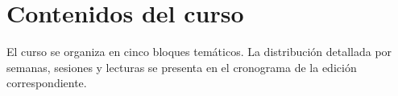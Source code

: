 
%

\section{Contenidos del curso}

El curso se organiza en cinco bloques temáticos. La distribución
detallada por semanas, sesiones y lecturas se presenta en el
cronograma de la edición correspondiente.



\begingroup

\small

\renewcommand{\arraystretch}{1.25}

\setlength{\tabcolsep}{7pt}

\newpage


